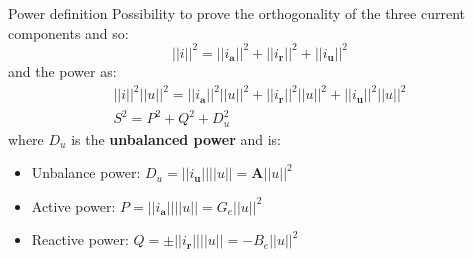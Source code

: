 \documentclass[aspectratio=169]{beamer}
\begin{document}
  \begin{frame}{Power definition}{\insertsection}
  Possibility to prove the orthogonality of the three current components and so:
  \begin{equation}
    ||\pmb{\mathit{i}}||^2 = ||\pmb{\mathit{i}_{a}}||^2 + ||\pmb{\mathit{i}_{r}}||^2 + ||\pmb{\mathit{i}_{u}}||^2
  \end{equation}
  and the power as:
  \begin{gather}
    ||\pmb{\mathit{i}}||^2||\pmb{\mathit{u}}||^2 = ||\pmb{\mathit{i}_{a}}||^2||\pmb{\mathit{u}}||^2 + ||\pmb{\mathit{i}_{r}}||^2||\pmb{\mathit{u}}||^2 + ||\pmb{\mathit{i}_{u}}||^2||\pmb{\mathit{u}}||^2\\
    S^2 = P^2 + Q^2 + D_u^2
  \end{gather}
  where $D_u$ is the \textbf{unbalanced power} and is:
  \begin{itemize}
    \item Unbalance power: $D_u = ||\pmb{\mathit{i}_{u}}|| ||\pmb{\mathit{u}}||= \pmb{A} ||\pmb{\mathit{u}}||^2$
    \item Active power: $P = ||\pmb{\mathit{i}_{a}}|| ||\pmb{\mathit{u}}||= G_e ||\pmb{\mathit{u}}||^2$
    \item Reactive power: $Q = \pm||\pmb{\mathit{i}_{r}}|| ||\pmb{\mathit{u}}||= -B_e ||\pmb{\mathit{u}}||^2$
  \end{itemize}
  \end{frame}
\end{document}
